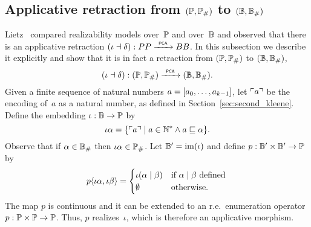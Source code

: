 

\subsection{Applicative retraction from $(\mathbb{P}, \mathbb{P}_{\#})$ to
  $(\mathbb{B}, \mathbb{B}_{\#})$}
\label{sec:applicative_retraction_PP_BB}%

%
%

Lietz~\cite{Lietz:99} compared realizability models over~$\mathbb{P}$ and
over~$\mathbb{B}$ and observed that there is an applicative retraction
$(\iota \dashv \delta): PP \xrightarrow{\scriptscriptstyle\mathsf{\ PCA\ }}{} BB$. In this subsection we
describe it explicitly and show that it is in fact a retraction from
$(\mathbb{P}, \mathbb{P}_{\#})$ to $(\mathbb{B}, \mathbb{B}_{\#})$,
\begin{equation*}
  (\iota \dashv \delta): (\mathbb{P}, \mathbb{P}_{\#}) \xrightarrow{\scriptscriptstyle\mathsf{\ PCA\ }}{} (\mathbb{B}, \mathbb{B}_{\#}).
\end{equation*}
Given a finite sequence of natural numbers $a = [a_0, \ldots,
  a_{k-1}]$, let $\ulcorner a \urcorner$ be the encoding of~$a$ as a natural
number, as defined in Section~\ref{sec:second_kleene}. Define the
embedding $\iota: \mathbb{B} \to \mathbb{P}$ by
\begin{equation*}
  \iota \alpha =
  \{ \ulcorner a \urcorner \mid
    a \in \mathbb{N}^{*} \land a  \sqsubseteq \alpha 
    \}.
\end{equation*}
Observe that if $\alpha \in \mathbb{B}_{\#}$ then $\iota \alpha \in \mathbb{P}_{\#}$.
Let $\mathbb{B}' = \mathrm{im}(\iota)$ and define $p: \mathbb{B}' \times \mathbb{B}' \to \mathbb{P}$
by
\begin{equation*}
  p \langle \iota \alpha, \iota \beta \rangle =
  \begin{cases}
    \iota (\alpha \mid \beta) 
    & \text{if $\alpha \mid \beta$ defined} \,\\
    \emptyset
    & \text{otherwise}.
  \end{cases}
\end{equation*}
The map $p$ is continuous and it can be extended to an
r.e.~enumeration operator $p: \mathbb{P} \times \mathbb{P} \to \mathbb{P}$. Thus, $p$
realizes~$\iota$, which is therefore an applicative morphism.

